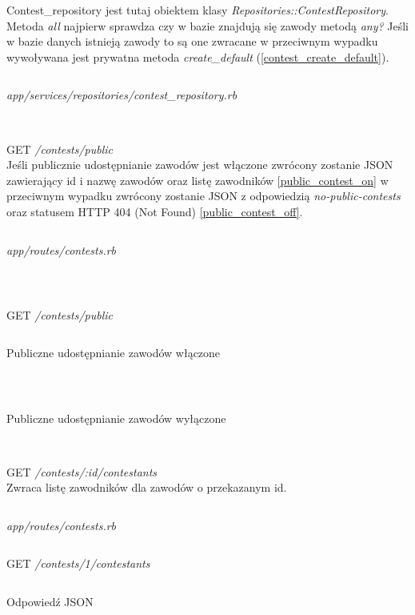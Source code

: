 \documentclass[11pt,a4paper, twoside]{article}
\begin{document}
\indent Contest\_repository jest tutaj obiektem klasy \emph{Repositories::ContestRepository}. Metoda \emph{all} najpierw sprawdza czy w bazie znajdują się zawody metodą \emph{any?} Jeśli w bazie danych istnieją zawody to są one zwracane w przeciwnym wypadku wywoływana jest prywatna metoda \emph{create\_default} (\ref{contest_create_default}).
\begin{listing}
\inputminted{ruby}{./src/contest_create_default.rb}
\caption{\emph{app/services/repositories/contest\_repository.rb}}
$\label{contest_create_default}$
\end{listing}
\newpage
\noindent
GET \emph{/contests/public}
\\
\noindent
Jeśli publicznie udostępnianie zawodów jest włączone zwrócony zostanie JSON zawierający id i nazwę zawodów oraz listę zawodników \ref{public_contest_on} w przeciwnym wypadku zwrócony zostanie JSON z odpowiedzią \emph{no-public-contests} oraz statusem HTTP 404 (Not Found) \ref{public_contest_off}.
\begin{listing}
\inputminted{ruby}{./src/get_contest_public.rb}
\caption{\emph{app/routes/contests.rb}}
$\label{get_contest_public}$
\end{listing}
\begin{listing}
\inputminted{ruby}{./src/curl_public_contest}
\caption{GET \emph{/contests/public}}
\end{listing}
\newpage
\begin{listing}
\inputminted{json}{./src/curl_public_contest_on}
\caption{Publiczne udostępnianie zawodów włączone}
$\label{public_contest_on}$
\end{listing}
\begin{listing}
\inputminted{json}{./src/curl_public_contest_off}
\caption{Publiczne udostępnianie zawodów wyłączone}
$\label{public_contest_off}$
\end{listing}
\noindent
GET \emph{/contests/:id/contestants}
\\
\noindent
Zwraca listę zawodników dla zawodów o przekazanym id.
\begin{listing}
\inputminted{ruby}{./src/contest_contestants.rb}
\caption{\emph{app/routes/contests.rb}}
\end{listing}
\begin{listing}[H]
\inputminted{ruby}{./src/curl_contest_contestants}
\caption{GET \emph{/contests/1/contestants}}
\end{listing}
\begin{listing}[H]
\inputminted{json}{./src/curl_contest_contestants_response}
\caption{Odpowiedź JSON}
\end{listing}
\end{document}
